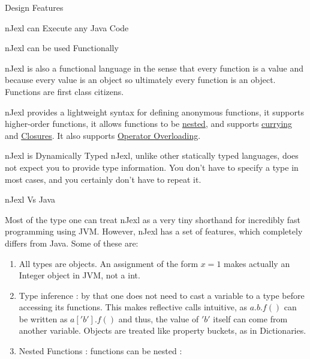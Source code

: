 \begin{section}{Design Features}
\begin{subsection}{nJexl can Execute any Java Code}
\end{subsection}


\begin{subsection}{nJexl can be used Functionally}

nJexl is also a functional language in the sense that every function is a value and because every value is an object so ultimately every function is an object. Functions are first class citizens.

nJexl provides a lightweight syntax for defining anonymous functions, it supports higher-order functions, it allows functions to be 
\href{https://en.wikipedia.org/wiki/Nested_function}{nested}, and supports \href{https://en.wikipedia.org/wiki/Currying}{currying} and \href{https://en.wikipedia.org/wiki/Closure_(computer_programming)}{Closures}. 
It also supports \href{https://en.wikipedia.org/wiki/Operator_overloading}{Operator Overloading}. 

\end{subsection}

\begin{subsection}{nJexl is Dynamically Typed}
nJexl, unlike other statically typed languages, does not expect you to provide type information. 
You don't have to specify a type in most cases, and you certainly don't have to repeat it.

\end{subsection}

\begin{subsection}{nJexl Vs Java}

Most of the type one can treat nJexl as a very tiny shorthand for incredibly fast programming using JVM.
However, nJexl has a set of features, which completely differs from Java. Some of these are:

\begin{enumerate}

\item{ All types are objects. An assignment of the form $x = 1 $ makes actually an Integer object in JVM, not a int. }

\item { Type inference :  by that one does not need to cast a variable to a type before accessing its functions. 
    This makes reflective calls intuitive, as $ a.b.f() $ can be written as $ a['b'].f() $ and thus, the value of $'b'$
    itself can come from another variable. Objects are treated like property buckets, as in Dictionaries.  
}

\item { Nested Functions : functions can be nested :

}
\end{enumerate}
\end{subsection}
\end{section}

